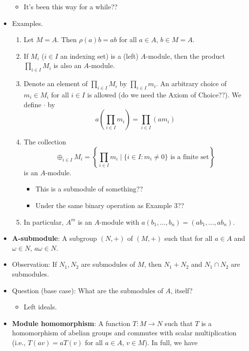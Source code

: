 \documentclass[../notes.tex]{subfiles}
\begin{document}
\begin{itemize}
\begin{itemize}
        \item It's been this way for a while??
    \end{itemize}
    \item Examples.
    \begin{enumerate}
        \item Let $M=A$. Then $\rho(a)b=ab$ for all $a\in A$, $b\in M=A$.
        \item If $M_i$ ($i\in I$ an indexing set) is a (left) $A$-module, then the product $\prod_{i\in I}M_i$ is also an $A$-module.
        \item Denote an element of $\prod_{i\in I}M_i$ by $\prod_{i\in I}m_i$. An arbitrary choice of $m_i\in M_i$ for all $i\in I$ is allowed (do we need the Axiom of Choice??). We define $\cdot$ by
        \begin{equation*}
            a\left( \prod_{i\in I}m_i \right) = \prod_{i\in I}(am_i)
        \end{equation*}
        \item The collection
        \begin{equation*}
            \oplus_{i\in I}M_i = \left\{ \prod_{i\in I}m_i\mid\{i\in I:m_i\neq 0\}\text{ is a finite set} \right\}
        \end{equation*}
        is an $A$-module.
        \begin{itemize}
            \item This is a submodule of something??
            \item Under the same binary operation as Example 3??
        \end{itemize}
        \item In particular, $A^m$ is an $A$-module with $a(b_1,\dots,b_n)=(ab_1,\dots,ab_n)$.
    \end{enumerate}
    \item \textbf{$\bm{A}$-submodule}: A subgroup $(N,+)$ of $(M,+)$ such that for all $a\in A$ and $\omega\in N$, $a\omega\in N$.
    \item Observation: If $N_1,N_2$ are submodules of $M$, then $N_1+N_2$ and $N_1\cap N_2$ are submodules.
    \item Question (base case): What are the submodules of $A$, itself?
    \begin{itemize}
        \item Left ideals.
    \end{itemize}
    \item \textbf{Module homomorphism}: A function $T:M\to N$ such that $T$ is a homomorphism of abelian groups and commutes with scalar multiplication (i.e., $T(av)=aT(v)$ for all $a\in A$, $v\in M$). In full, we have

\end{itemize}
\end{document}
